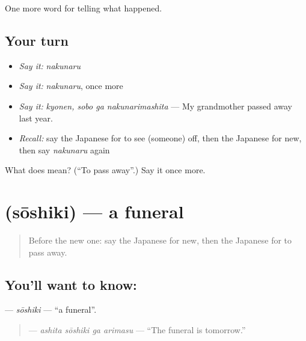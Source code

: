 \begin{grammarlens}[title={What you've built}]
One more word for telling what happened.
\end{grammarlens}

\subsection*{Your turn}
\begin{itemize}
\raggedright
  \item \emph{Say it:} \emph{nakunaru}
  \item \emph{Say it:} \emph{nakunaru}, once more
  \item \emph{Say it:} \emph{kyonen, sobo ga nakunarimashita} — My grandmother passed away last year.
  \item \emph{Recall:} say the Japanese for to see (someone) off, then the Japanese for new, then say \emph{nakunaru} again
\end{itemize}

\begin{tcolorbox}[breakable,colback=teal!4,colframe=teal!35!black,title={Before you move on}]
What does  mean? (\textquotedblleft{}To pass away\textquotedblright{}.) Say it once more.
\end{tcolorbox}
\section[\texorpdfstring{\ja{そうしき} (sōshiki)}{そうしき (sōshiki)}]{ (sōshiki) — a funeral}

\label{lesson:JA-C291-soushiki}



\begin{quote}
Before the new one: say the Japanese for new, then the Japanese for to pass away.
\end{quote}

\subsection*{You'll want to know: }
\textbf{} — \emph{sōshiki} — \textquotedblleft{}a funeral\textquotedblright{}.

\begin{quote}
\textbf{  } — \emph{ashita sōshiki ga arimasu} — \textquotedblleft{}The funeral is tomorrow.\textquotedblright{}
\end{quote}

